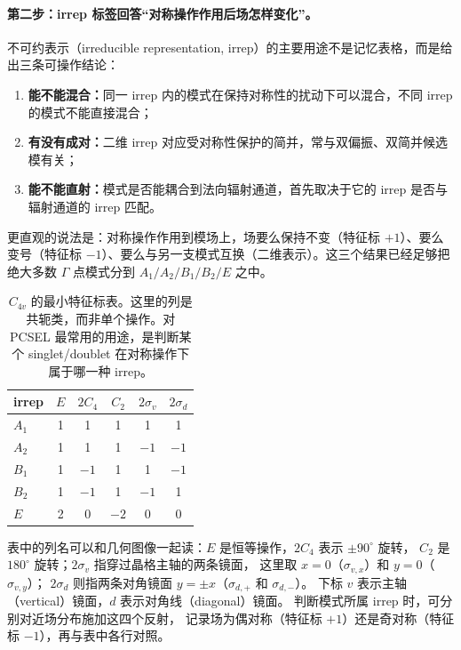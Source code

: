 \paragraph{第二步：irrep 标签回答“对称操作作用后场怎样变化”。}
不可约表示（irreducible representation, irrep）的主要用途不是记忆表格，而是给出三条可操作结论：
\begin{enumerate}
  \item \textbf{能不能混合：}同一 irrep 内的模式在保持对称性的扰动下可以混合，不同 irrep 的模式不能直接混合；
  \item \textbf{有没有成对：}二维 irrep 对应受对称性保护的简并，常与双偏振、双简并候选模有关；
  \item \textbf{能不能直射：}模式是否能耦合到法向辐射通道，首先取决于它的 irrep 是否与辐射通道的 irrep 匹配。
\end{enumerate}

更直观的说法是：对称操作作用到模场上，场要么保持不变（特征标 $+1$）、要么变号（特征标 $-1$）、要么与另一支模式互换（二维表示）。这三个结果已经足够把绝大多数 $\Gamma$ 点模式分到 $A_1/A_2/B_1/B_2/E$ 之中。

\begin{table}[htbp]
  \centering
  \footnotesize
  \caption{$C_{4v}$ 的最小特征标表。这里的列是共轭类，而非单个操作。对 PCSEL 最常用的用途，是判断某个 singlet/doublet 在对称操作下属于哪一种 irrep。}
  \label{tab:c4v-character}
  \setlength{\tabcolsep}{5pt}
  \begin{tabular}{@{}lccccc@{}}
    \toprule
    irrep & $E$ & $2C_4$ & $C_2$ & $2\sigma_v$ & $2\sigma_d$ \\
    \midrule
    $A_1$ & 1 & 1 & 1 & 1 & 1 \\
    $A_2$ & 1 & 1 & 1 & $-1$ & $-1$ \\
    $B_1$ & 1 & $-1$ & 1 & 1 & $-1$ \\
    $B_2$ & 1 & $-1$ & 1 & $-1$ & 1 \\
    $E$ & 2 & 0 & $-2$ & 0 & 0 \\
    \bottomrule
  \end{tabular}
\end{table}

表中的列名可以和几何图像一起读：$E$ 是恒等操作，$2C_4$ 表示 $\pm 90^\circ$ 旋转，
$C_2$ 是 $180^\circ$ 旋转；$2\sigma_v$ 指穿过晶格主轴的两条镜面，
这里取 $x=0$（$\sigma_{v,x}$）和 $y=0$（$\sigma_{v,y}$）；
$2\sigma_d$ 则指两条对角镜面 $y=\pm x$（$\sigma_{d,+}$ 和 $\sigma_{d,-}$）。
下标 $v$ 表示主轴（vertical）镜面，$d$ 表示对角线（diagonal）镜面。
判断模式所属 irrep 时，可分别对近场分布施加这四个反射，
记录场为偶对称（特征标 $+1$）还是奇对称（特征标 $-1$），再与表中各行对照。

